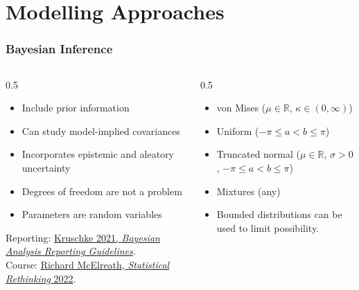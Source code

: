 \documentclass[compress, aspectratio=169]{beamer}
\begin{document}
\section{Modelling Approaches}

\begin{frame}
	\frametitle{Bayesian Inference}	
	\begin{columns}
	\begin{column}{0.5\textwidth}
	\begin{cmarker}
	\begin{itemize}
	\item Include prior information
	\item Can study model-implied covariances
	\item Incorporates epistemic and aleatory uncertainty
	\item Degrees of freedom are not a problem
	\item Parameters are random variables
	\end{itemize}
	\end{cmarker}
	\tiny Reporting: \href{https://www.nature.com/articles/s41562-021-01177-7}{Kruschke 2021, \textit{Bayesian Analysis Reporting Guidelines}}.\\
	
	\tiny Course: \href{https://www.youtube.com/playlist?list=PLDcUM9US4XdMROZ57-OIRtIK0aOynbgZN}{Richard McElreath, \textit{Statistical Rethinking} 2022}.
	\end{column}
	\begin{column}{0.5\textwidth}
	\begin{tmarker}[title=Circular Distributions]
	\begin{itemize}
		\item von Mises ($\mu \in \mathbb{R}$, $\kappa \in (0, \infty)$)
		\item Uniform ($-\pi \leq a < b \leq \pi$)
		\item Truncated normal ($\mu \in \mathbb{R}$, $\sigma >0$, $-\pi \leq a < b \leq \pi$)
		\item Mixtures (any)
	\end{itemize}
	\tcbline
	\begin{itemize}
		\item Bounded distributions can be used to limit possibility.
	\end{itemize}
	\end{tmarker}
	\end{column}
	\end{columns}
\end{frame}
\end{document}
